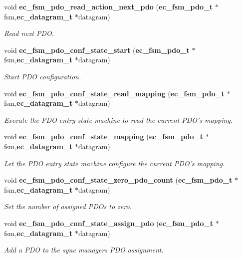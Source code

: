 \begin{DoxyCompactItemize}
void {\bf ec\-\_\-fsm\-\_\-pdo\-\_\-read\-\_\-action\-\_\-next\-\_\-pdo} ({\bf ec\-\_\-fsm\-\_\-pdo\-\_\-t} $\ast$fsm,{\bf ec\-\_\-datagram\-\_\-t} $\ast$datagram)
\begin{DoxyCompactList}\small\item\em Read next P\-D\-O. \end{DoxyCompactList}\item 
void {\bf ec\-\_\-fsm\-\_\-pdo\-\_\-conf\-\_\-state\-\_\-start} ({\bf ec\-\_\-fsm\-\_\-pdo\-\_\-t} $\ast$fsm,{\bf ec\-\_\-datagram\-\_\-t} $\ast$datagram)
\begin{DoxyCompactList}\small\item\em Start P\-D\-O configuration. \end{DoxyCompactList}\item 
void {\bf ec\-\_\-fsm\-\_\-pdo\-\_\-conf\-\_\-state\-\_\-read\-\_\-mapping} ({\bf ec\-\_\-fsm\-\_\-pdo\-\_\-t} $\ast$fsm,{\bf ec\-\_\-datagram\-\_\-t} $\ast$datagram)
\begin{DoxyCompactList}\small\item\em Execute the P\-D\-O entry state machine to read the current P\-D\-O's mapping. \end{DoxyCompactList}\item 
void {\bf ec\-\_\-fsm\-\_\-pdo\-\_\-conf\-\_\-state\-\_\-mapping} ({\bf ec\-\_\-fsm\-\_\-pdo\-\_\-t} $\ast$fsm,{\bf ec\-\_\-datagram\-\_\-t} $\ast$datagram)
\begin{DoxyCompactList}\small\item\em Let the P\-D\-O entry state machine configure the current P\-D\-O's mapping. \end{DoxyCompactList}\item 
void {\bf ec\-\_\-fsm\-\_\-pdo\-\_\-conf\-\_\-state\-\_\-zero\-\_\-pdo\-\_\-count} ({\bf ec\-\_\-fsm\-\_\-pdo\-\_\-t} $\ast$fsm,{\bf ec\-\_\-datagram\-\_\-t} $\ast$datagram)
\begin{DoxyCompactList}\small\item\em Set the number of assigned P\-D\-Os to zero. \end{DoxyCompactList}\item 
void {\bf ec\-\_\-fsm\-\_\-pdo\-\_\-conf\-\_\-state\-\_\-assign\-\_\-pdo} ({\bf ec\-\_\-fsm\-\_\-pdo\-\_\-t} $\ast$fsm,{\bf ec\-\_\-datagram\-\_\-t} $\ast$datagram)
\begin{DoxyCompactList}\small\item\em Add a P\-D\-O to the sync managers P\-D\-O assignment. \end{DoxyCompactList}\item 

\end{DoxyCompactItemize}
